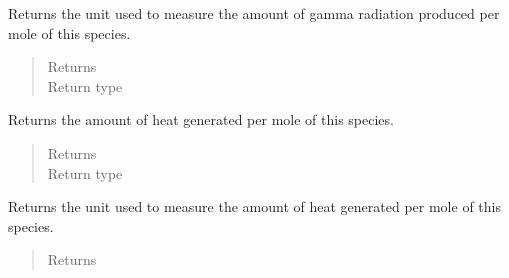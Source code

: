 \documentclass[letterpaper,10pt,openany,oneside,english]{sphinxmanual}
\begin{document}
\begin{fulllineitems}
\begin{fulllineitems}
\label{\detokenize{support_rst/specie:specie.Specie.molarGammaPwrUnit}}
Returns the unit used to measure the amount of gamma radiation produced
per mole of this species.
\begin{quote}\begin{description}
\item[{Returns}] \leavevmode
{}

\item[{Return type}] \leavevmode
{}

\end{description}\end{quote}

\end{fulllineitems}


\begin{fulllineitems}
\label{\detokenize{support_rst/specie:specie.Specie.molarHeatPwr}}
Returns the amount of heat generated per mole of this species.
\begin{quote}\begin{description}
\item[{Returns}] \leavevmode
{}

\item[{Return type}] \leavevmode
{}

\end{description}\end{quote}

\end{fulllineitems}


\begin{fulllineitems}
\label{\detokenize{support_rst/specie:specie.Specie.molarHeatPwrUnit}}
Returns the unit used to measure the amount of heat generated per mole
of this species.
\begin{quote}\begin{description}
\item[{Returns}] \leavevmode
{}


\end{description}
\end{quote}
\end{fulllineitems}
\end{fulllineitems}
\end{document}

